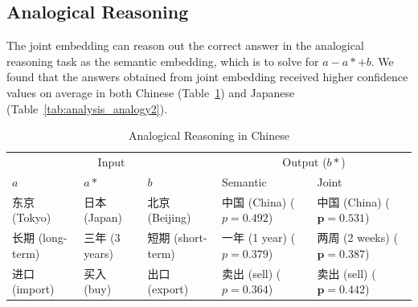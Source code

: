\subsection{Analogical Reasoning} \label{sec:analysis_analogy}

The joint embedding can reason out the correct answer in the analogical reasoning task as the semantic embedding, which is to solve for $a-a*+b$. We found that the answers obtained from joint embedding received higher confidence values on average in both Chinese (Table~\ref{tab:analysis_analogy1}) and Japanese (Table~\ref{tab:analysis_analogy2}). 

\begin{table}[h]
    \centering
    \begin{CJK}{UTF8}{gbsn}
        \begin{tabularx}{\textwidth}{lllbb}
            \toprule
            \multicolumn{3}{c}{Input} & \multicolumn{2}{c}{Output ($b*$)} \\
            \cmidrule(lr){1-3} \cmidrule(lr){4-5} $a$ & $a*$ & $b$ & Semantic & Joint \\\midrule
            \vspace{0.2cm} 东京 (Tokyo) & 日本 (Japan) & 北京 (Beijing) & 中国 (China) \newline ($p=0.492$) & 中国 (China) \newline ($\bm{p=0.531}$) \\
            \vspace{0.2cm} 长期 (long-term) & 三年 (3 years) & 短期 (short-term) & 一年 (1 year) \newline ($p=0.379$) & 两周 (2 weeks) \newline ($\bm{p=0.387}$) \\
            进口 (import) & 买入 (buy) & 出口 (export) & 卖出 (sell) \newline ($p=0.364$) & 卖出 (sell) \newline ($\bm{p=0.442}$)\\\bottomrule
        \end{tabularx}
    \end{CJK}
    \caption{Analogical Reasoning in Chinese}
    \label{tab:analysis_analogy1}
\end{table}

